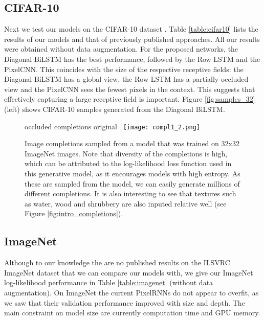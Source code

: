 \documentclass{article}
\begin{document}
\subsection{CIFAR-10}

Next we test our models on the CIFAR-10 dataset \cite{krizhevsky2009learning}. Table \ref{table:cifar10} lists the results of our models and that of previously published approaches. All our results were obtained without data augmentation. For the proposed networks, the Diagonal BiLSTM has the best performance, followed by the Row LSTM and the PixelCNN. This coincides with the size of the respective receptive fields: the Diagonal BiLSTM has a global view, the Row LSTM has a partially occluded view and the PixelCNN sees the fewest pixels in the context. This suggests that effectively capturing a large receptive field is important. 
Figure \ref{fig:samples_32} (left) shows CIFAR-10 samples generated from the Diagonal BiLSTM.

\begin{figure}[!ht]
\centering
\hspace{0.02cm} {occluded} \hfill completions \hfill{original} \,
\vspace{0.1cm}
\texttt{[image: compl1\_2.png]}
\vspace{-0.5cm}
\caption{Image completions sampled from a model that was trained on 32x32 ImageNet images. Note that diversity of the completions is high, which can be attributed to the log-likelihood loss function used in this generative model, as it encourages models with high entropy. As these are sampled from the model, we can easily generate millions of different completions. It is also interesting to see that textures such as water, wood and shrubbery are also inputed relative well (see Figure \ref{fig:intro_completions}).}
\label{fig:completions}
\vspace{-0.2cm}
\end{figure}






\vspace{0.4cm}
\subsection{ImageNet}

Although to our knowledge the are no published results on the ILSVRC ImageNet dataset \cite{ILSVRC15} that we can compare our models with, we give our ImageNet log-likelihood performance in Table \ref{table:imagenet} (without data augmentation). On ImageNet the current PixelRNNs do not appear to overfit, as we saw that their validation performance improved with size and depth. The main constraint on model size are currently computation time and GPU memory.
\end{document}
